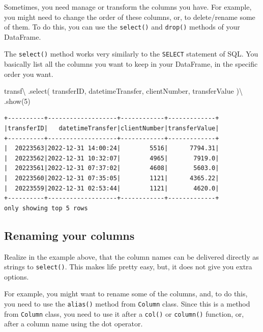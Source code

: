 \documentclass[
  11pt,
  letterpaper,
  DIV=11,
  numbers=noendperiod]{scrreprt}
\newenvironment{Shaded}{\begin{snugshade}}{\end{snugshade}}
\newcommand{\DecValTok}[1]{\textcolor[rgb]{0.68,0.00,0.00}{#1}}
\newcommand{\NormalTok}[1]{\textcolor[rgb]{0.00,0.23,0.31}{#1}}
\newcommand{\OperatorTok}[1]{\textcolor[rgb]{0.37,0.37,0.37}{#1}}
\newcommand{\StringTok}[1]{\textcolor[rgb]{0.13,0.47,0.30}{#1}}
\begin{document}
Sometimes, you need manage or transform the columns you have. For
example, you might need to change the order of these columns, or, to
delete/rename some of them. To do this, you can use the
\texttt{select()} and \texttt{drop()} methods of your DataFrame.

The \texttt{select()} method works very similarly to the \texttt{SELECT}
statement of SQL. You basically list all the columns you want to keep in
your DataFrame, in the specific order you want.

\begin{Shaded}
\begin{Highlighting}[]
\NormalTok{transf}\OperatorTok{\textbackslash{}}
\NormalTok{  .select(}
    \StringTok{\textquotesingle{}transferID\textquotesingle{}}\NormalTok{, }\StringTok{\textquotesingle{}datetimeTransfer\textquotesingle{}}\NormalTok{,}
    \StringTok{\textquotesingle{}clientNumber\textquotesingle{}}\NormalTok{, }\StringTok{\textquotesingle{}transferValue\textquotesingle{}}
\NormalTok{  )}\OperatorTok{\textbackslash{}}
\NormalTok{  .show(}\DecValTok{5}\NormalTok{)}
\end{Highlighting}
\end{Shaded}

\begin{verbatim}
+----------+-------------------+------------+-------------+
|transferID|   datetimeTransfer|clientNumber|transferValue|
+----------+-------------------+------------+-------------+
|  20223563|2022-12-31 14:00:24|        5516|      7794.31|
|  20223562|2022-12-31 10:32:07|        4965|       7919.0|
|  20223561|2022-12-31 07:37:02|        4608|       5603.0|
|  20223560|2022-12-31 07:35:05|        1121|      4365.22|
|  20223559|2022-12-31 02:53:44|        1121|       4620.0|
+----------+-------------------+------------+-------------+
only showing top 5 rows
\end{verbatim}

\subsection{Renaming your columns}\label{renaming-your-columns}

Realize in the example above, that the column names can be delivered
directly as strings to \texttt{select()}. This makes life pretty easy,
but, it does not give you extra options.

For example, you might want to rename some of the columns, and, to do
this, you need to use the \texttt{alias()} method from \texttt{Column}
class. Since this is a method from \texttt{Column} class, you need to
use it after a \texttt{col()} or \texttt{column()} function, or, after a
column name using the dot operator.
\end{document}
